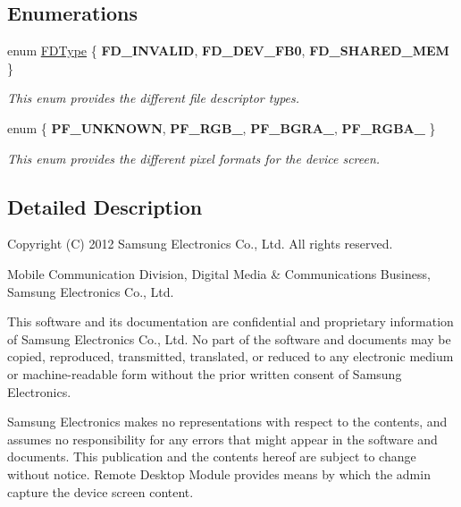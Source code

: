 \subsection*{\-Enumerations}
\begin{DoxyCompactItemize}
\item 
enum \hyperlink{namespaceknoxremotedesktop_a01c73ba2fbebc2395aae6198eb87a416}{\-F\-D\-Type} \{ {\bfseries \-F\-D\-\_\-\-I\-N\-V\-A\-L\-I\-D}, 
{\bfseries \-F\-D\-\_\-\-D\-E\-V\-\_\-\-F\-B0}, 
{\bfseries \-F\-D\-\_\-\-S\-H\-A\-R\-E\-D\-\_\-\-M\-E\-M}
 \}
\begin{DoxyCompactList}\small\item\em \-This enum provides the different file descriptor types. \end{DoxyCompactList}\item 
enum \{ {\bfseries \-P\-F\-\_\-\-U\-N\-K\-N\-O\-W\-N}, 
{\bfseries \-P\-F\-\_\-\-R\-G\-B\-\_}, 
{\bfseries \-P\-F\-\_\-\-B\-G\-R\-A\-\_}, 
{\bfseries \-P\-F\-\_\-\-R\-G\-B\-A\-\_}
 \}
\begin{DoxyCompactList}\small\item\em \-This enum provides the different pixel formats for the device screen. \end{DoxyCompactList}\end{DoxyCompactItemize}


\subsection{\-Detailed \-Description}
\-Copyright (\-C) 2012 \-Samsung \-Electronics \-Co., \-Ltd. \-All rights reserved.

\-Mobile \-Communication \-Division, \-Digital \-Media \& \-Communications \-Business, \-Samsung \-Electronics \-Co., \-Ltd.

\-This software and its documentation are confidential and proprietary information of \-Samsung \-Electronics \-Co., \-Ltd. \-No part of the software and documents may be copied, reproduced, transmitted, translated, or reduced to any electronic medium or machine-\/readable form without the prior written consent of \-Samsung \-Electronics.

\-Samsung \-Electronics makes no representations with respect to the contents, and assumes no responsibility for any errors that might appear in the software and documents. \-This publication and the contents hereof are subject to change without notice. \-Remote \-Desktop \-Module provides means by which the admin capture the device screen content. 

